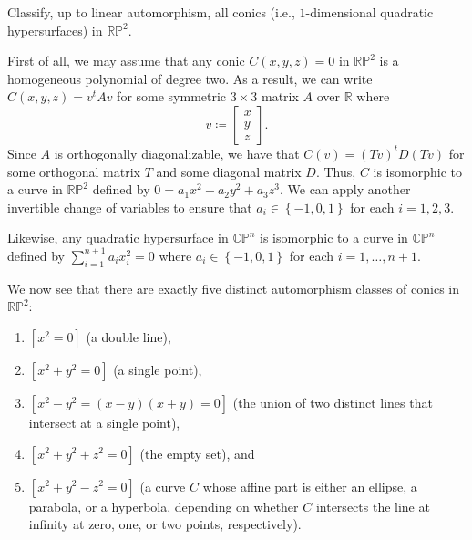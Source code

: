 \documentclass[10pt,letterpaper,cm]{nupset}
\theoremstyle{definition}
\theoremstyle{theorem}
\theoremstyle{remark}
\newcommand{\CP}{\mathbb{CP}}
\newcommand{\R}{\mathbb{R}}
\newcommand{\RP}{\mathbb{RP}}
\newcommand{\1}{\mathbb{1}}
\newcommand{\0}{\vec 0}
\newcommand{\be}{\begin{enumerate}}
\newcommand{\ee}{\end{enumerate}}
\begin{document}
\begin{problem}

Classify, up to linear automorphism, all conics	(i.e., $1$-dimensional	quadratic
hypersurfaces)	in	$\RP^2$.
\end{problem}
\begin{solution}
First of all, we may assume that any conic $C(x,y,z) =0$ in $\RP^2$ is a homogeneous polynomial of degree two. As a result, we can write  $C(x,y,z)= v^tAv$  for some symmetric $3\times 3$ matrix $A$ over $\R$ where $$v \coloneqq \begin{bmatrix} x \\ y \\ z \end{bmatrix}.$$  Since $A$ is orthogonally diagonalizable, we have that $C(v) = \left(Tv\right)^tD(Tv)$ for some orthogonal matrix $T$ and some diagonal matrix $D$.  Thus, $C$ is isomorphic to a curve in $\RP^2$ defined by $0 = a_1x^2 + a_2y^2 + a_3z^3$. We can apply another invertible change of variables to ensure that $a_i \in \left\{{-1}, 0, 1\right\}$ for each $i=1,2,3$.

\smallskip

Likewise, any quadratic hypersurface in $\CP^n$ is isomorphic to a curve in $\CP^n$ defined by $\sum_{i=1}^{n+1}a_ix_i^2 = 0$ where $a_i \in \left\{{-1}, 0, 1\right\}$ for each $i=1, \ldots, n+1$.

\medskip

We now see that there are exactly five distinct automorphism classes of conics in $\RP^2$:
\be[label=(\alph*)]
\item $\left[x^2 =0\right]$ (a double line),
\item $\left[x^2 + y^2 =0\right]$ (a single point),
\item $\left[x^2 -y^2= \left(x-y\right)\left(x+y\right)=0\right]$ (the union of two distinct lines that intersect at a single point),
\item $\left[x^2 +y^2 + z^2 =0\right]$ (the empty set), and
\item $\left[x^2 + y^2-z^2 =0\right]$ (a curve $C$ whose affine part is either an ellipse, a parabola, or a hyperbola, depending on whether $C$ intersects the line at infinity at zero, one, or two points, respectively).
\ee

\end{solution}
\end{document}
